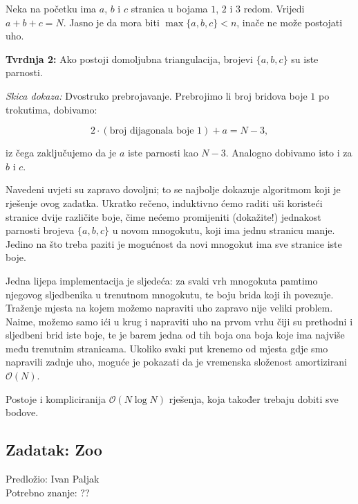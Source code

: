 \documentclass[a4paper]{article}
\begin{document}
Neka na početku ima $a$, $b$ i $c$ stranica u bojama $1$, $2$ i $3$ redom.
Vrijedi $a+b+c = N$. Jasno je da mora biti $\max\{a, b, c\} < n$, inače ne može postojati uho.

\textbf{Tvrdnja 2: } \; Ako postoji domoljubna triangulacija, brojevi $\{a, b, c\}$ su iste parnosti.

\emph{Skica dokaza: } \; Dvostruko prebrojavanje.
Prebrojimo li broj bridova boje $1$ po trokutima, dobivamo:

$$
  2 \cdot (\text{broj dijagonala boje 1}) + a = N - 3,
$$

iz čega zaključujemo da je $a$ iste parnosti kao $N-3$. Analogno dobivamo isto i za $b$ i $c$.

Navedeni uvjeti su zapravo dovoljni; to se najbolje dokazuje algoritmom koji je rješenje ovog zadatka.
Ukratko rečeno, induktivno ćemo raditi uši koristeći stranice dvije različite boje,
čime nećemo promijeniti (dokažite!) jednakost parnosti brojeva $\{a, b, c\}$ u novom mnogokutu, koji
ima jednu stranicu manje.
Jedino na što treba paziti je mogućnost da novi mnogokut ima sve stranice iste boje.

Jedna lijepa implementacija je sljedeća: za svaki vrh mnogokuta pamtimo njegovog sljedbenika u
trenutnom mnogokutu, te boju brida koji ih povezuje. Traženje mjesta na kojem možemo napraviti
uho zapravo nije veliki problem.
Naime, možemo samo ići u krug i napraviti uho na prvom vrhu čiji su prethodni i sljedbeni brid
iste boje, te je barem jedna od tih boja ona boja koje ima najviše među trenutnim stranicama.
Ukoliko svaki put krenemo od mjesta gdje smo napravili zadnje uho, moguće je pokazati da
je vremenska složenost amortizirani $\mathcal{O}(N)$.

Postoje i kompliciranija $\mathcal{O}(N \log N)$ rješenja, koja također trebaju dobiti sve bodove.


\subsection*{Zadatak: Zoo}
\textsf{Predložio: Ivan Paljak}\\
\textsf{Potrebno znanje: ??}
\end{document}
